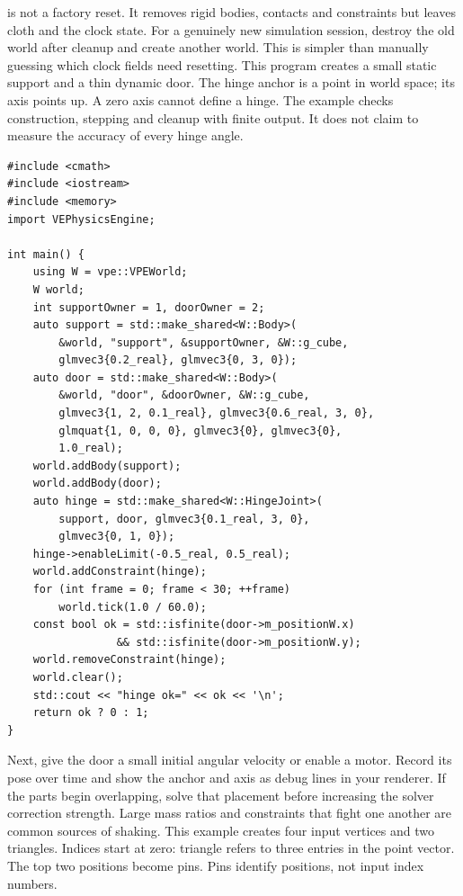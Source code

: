 \documentclass[11pt,a4paper]{article}
\begin{document}
 is not a factory reset. It removes rigid bodies, contacts and constraints but leaves cloth and the clock state. For a genuinely new simulation session, destroy the old world after cleanup and create another world. This is simpler than manually guessing which clock fields need resetting.
This program creates a small static support and a thin dynamic door. The hinge anchor is a point in world space; its axis points up. A zero axis cannot define a hinge. The example checks construction, stepping and cleanup with finite output. It does not claim to measure the accuracy of every hinge angle.%
\begin{lstlisting}
#include <cmath>
#include <iostream>
#include <memory>
import VEPhysicsEngine;

int main() {
    using W = vpe::VPEWorld;
    W world;
    int supportOwner = 1, doorOwner = 2;
    auto support = std::make_shared<W::Body>(
        &world, "support", &supportOwner, &W::g_cube,
        glmvec3{0.2_real}, glmvec3{0, 3, 0});
    auto door = std::make_shared<W::Body>(
        &world, "door", &doorOwner, &W::g_cube,
        glmvec3{1, 2, 0.1_real}, glmvec3{0.6_real, 3, 0},
        glmquat{1, 0, 0, 0}, glmvec3{0}, glmvec3{0},
        1.0_real);
    world.addBody(support);
    world.addBody(door);
    auto hinge = std::make_shared<W::HingeJoint>(
        support, door, glmvec3{0.1_real, 3, 0},
        glmvec3{0, 1, 0});
    hinge->enableLimit(-0.5_real, 0.5_real);
    world.addConstraint(hinge);
    for (int frame = 0; frame < 30; ++frame)
        world.tick(1.0 / 60.0);
    const bool ok = std::isfinite(door->m_positionW.x)
                 && std::isfinite(door->m_positionW.y);
    world.removeConstraint(hinge);
    world.clear();
    std::cout << "hinge ok=" << ok << '\n';
    return ok ? 0 : 1;
}
\end{lstlisting}
Next, give the door a small initial angular velocity or enable a motor. Record its pose over time and show the anchor and axis as debug lines in your renderer. If the parts begin overlapping, solve that placement before increasing the solver correction strength. Large mass ratios and constraints that fight one another are common sources of shaking.
This example creates four input vertices and two triangles. Indices start at zero: triangle  refers to three entries in the point vector. The top two positions become pins. Pins identify positions, not input index numbers.%
\end{document}
